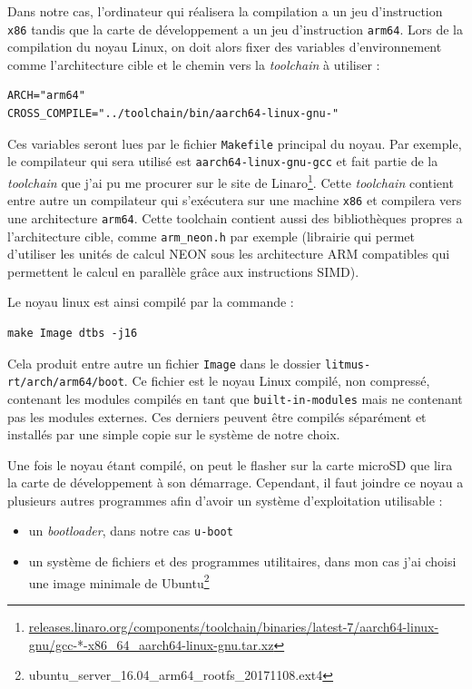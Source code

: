 Dans notre cas, l'ordinateur qui réalisera la compilation a un jeu d'instruction \texttt{x86} tandis que la carte de développement a un jeu d'instruction \texttt{arm64}. Lors de la compilation du noyau Linux, on doit alors fixer des variables d’environnement comme l'architecture cible et le chemin vers la \textit{toolchain} à utiliser : 
\begin{lstlisting}[style=command, caption=Variables pour la compilation croisée du noyau Linux]
ARCH="arm64"
CROSS_COMPILE="../toolchain/bin/aarch64-linux-gnu-"
\end{lstlisting}

Ces variables seront lues par le fichier \texttt{Makefile} principal du noyau. Par exemple, le compilateur qui sera utilisé est \texttt{aarch64-linux-gnu-gcc} et fait partie de la \textit{toolchain} que j'ai pu me procurer sur le site de Linaro\footnote{\href{https://releases.linaro.org/components/toolchain/binaries/latest-7/aarch64-linux-gnu/gcc-*-x86\_64\_aarch64-linux-gnu.tar.xz}{releases.linaro.org/components/toolchain/binaries/latest-7/aarch64-linux-gnu/gcc-*-x86\_64\_aarch64-linux-gnu.tar.xz}}.
Cette \textit{toolchain} contient entre autre un compilateur qui s’exécutera sur une machine \texttt{x86} et compilera vers une architecture \texttt{arm64}. Cette toolchain contient aussi des bibliothèques propres a l'architecture cible, comme \texttt{arm\_neon.h} par exemple (librairie qui permet d'utiliser les unités de calcul NEON sous les architecture ARM compatibles qui permettent le calcul en parallèle grâce aux instructions SIMD).

Le noyau linux est ainsi compilé par la commande :
\begin{lstlisting}[style=command]
    make Image dtbs -j16
\end{lstlisting}
Cela produit entre autre un fichier \texttt{Image} dans le dossier \texttt{litmus-rt/arch/arm64/boot}. Ce fichier est le noyau Linux compilé, non compressé, contenant les modules compilés en tant que \texttt{built-in-modules} mais ne contenant pas les modules externes. Ces derniers peuvent être compilés séparément et installés par une simple copie sur le système de notre choix. 

Une fois le noyau étant compilé, on peut le flasher sur la carte microSD que lira la carte de développement à son démarrage. Cependant, il faut joindre ce noyau a plusieurs autres programmes afin d'avoir un système d'exploitation utilisable : 
\begin{itemize}
    \item un \textit{bootloader}, dans notre cas \texttt{u-boot}
    \item un système de fichiers et des programmes utilitaires, dans mon cas j'ai choisi une image minimale de Ubuntu\footnote{ubuntu\_server\_16.04\_arm64\_rootfs\_20171108.ext4}
\end{itemize}

